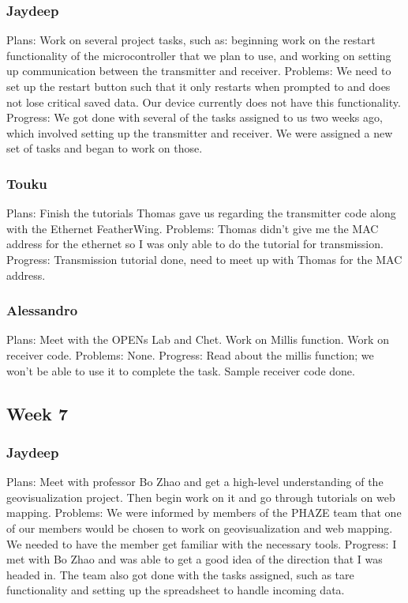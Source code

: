 \documentclass[onecolumn, draftclsnofoot,10pt, compsoc]{IEEEtran}
\begin{document}
\subsubsection{Jaydeep}
Plans:   Work on several project tasks, such as:  beginning work on the restart functionality of the microcontroller that we plan to use, and working  on setting up communication between the transmitter and receiver.   
\newline
Problems: We need to set up the restart button such that it only restarts when prompted to and does not lose critical saved data. Our device currently does not have this functionality.
\newline
Progress:   We got done with several of the tasks assigned to us two weeks ago, which involved setting up the transmitter and receiver. We were assigned a new set of tasks and began to work on those. 
\subsubsection{Touku}
Plans: Finish the tutorials Thomas gave us regarding the transmitter code along with the Ethernet FeatherWing.
\newline
Problems: Thomas didn’t give me the MAC address for the ethernet so I was only able to do the tutorial for transmission.
\newline
Progress: Transmission tutorial done, need to meet up with Thomas for the MAC address.

\subsubsection{Alessandro}
Plans: Meet with the OPENs Lab and Chet. Work on Millis function. Work on receiver code.
\newline
Problems: None.
\newline
Progress:  Read about the millis function; we won’t be able to use it to complete the task. Sample receiver code done.

\subsection{Week 7}
\subsubsection{Jaydeep}
Plans: Meet with professor Bo Zhao and get a high-level understanding of the geovisualization project. Then begin work on it and go through tutorials on web mapping. 
\newline
Problems: We were informed by members of the PHAZE team that one of our members would be chosen to work on geovisualization and web mapping. We needed to have the member get familiar with the necessary tools. 
\newline
Progress: I met with Bo Zhao and was able to get a good idea of the direction that I was headed in. The team also got done with the tasks assigned, such as tare functionality and setting up the spreadsheet to handle incoming data. 
\end{document}
